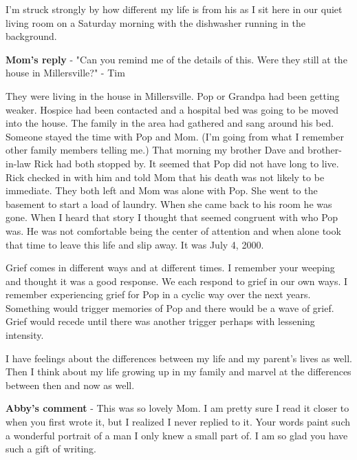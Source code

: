 I'm struck strongly by how different my life is from his as I sit here in our quiet living room on a Saturday morning with the dishwasher running in the background.

\textbf{Mom's reply} - "Can you remind me of the details of this.
Were they still at the house in Millersville?" - Tim

They were living in the house in Millersville.
Pop or Grandpa had been getting weaker.
Hospice had been contacted and a hospital bed was going to be moved into the house.
The family in the area had gathered and sang around his bed.
Someone stayed the time with Pop and Mom.
(I'm going from what I remember other family members telling me.) That morning my brother Dave and brother-in-law Rick had both stopped by.
It seemed that Pop did not have long to live.
Rick checked in with him and told Mom that his death was not likely to be immediate.
They both left and Mom was alone with Pop.
She went to the basement to start a load of laundry.
When she came back to his room he was gone.
When I heard that story I thought that seemed congruent with who Pop was.
He was not comfortable being the center of attention and when alone took that time to leave this life and slip away.
It was July 4, 2000.

Grief comes in different ways and at different times.
I remember your weeping and thought it was a good response.
We each respond to grief in our own ways.
I remember experiencing grief for Pop in a cyclic way over the next years.
Something would trigger memories of Pop and there would be a wave of grief.
Grief would recede until there was another trigger perhaps with lessening intensity.


I have feelings about the differences between my life and my parent's lives as well.
Then I think about my life growing up in my family and marvel at the differences between then and now as well.


\textbf{Abby's comment} - This was so lovely Mom.
I am pretty sure I read it closer to when you first wrote it, but I realized I never replied to it.
Your words paint such a wonderful portrait of a man I only knew a small part of.
I am so glad you have such a gift of writing.





